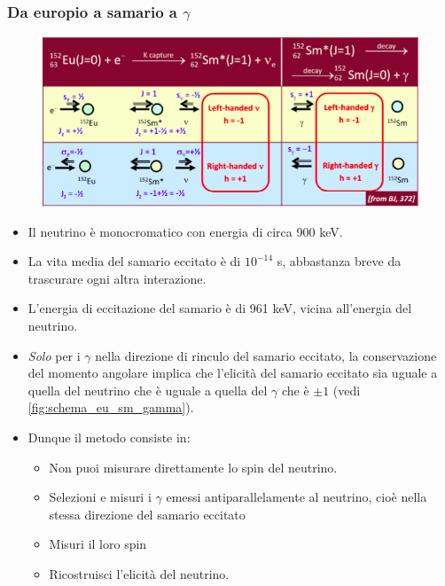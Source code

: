 \subsubsection{Da europio a samario a $\gamma$}
\begin{figure}[H]
    \centering
    \includegraphics[width=\textwidth]{immagini/fig_schema_eu_sm_gamma.png}
    \caption{}
    \label{fig:schema_eu_sm_gamma}
\end{figure}
\begin{itemize}
    \item Il neutrino è monocromatico con energia di circa 900 keV.
    \item La vita media del samario eccitato è di $10^{-14}$ s, abbastanza breve da trascurare ogni altra interazione.
    \item L'energia di eccitazione del samario è di 961 keV, vicina all'energia del neutrino.
    \item \textit{Solo} per i $\gamma$ nella direzione di rinculo del samario eccitato, la conservazione del momento angolare implica che l'elicità del samario eccitato sia uguale a quella del neutrino che è uguale a quella del $\gamma$ che è $\pm1$ (vedi \autoref{fig:schema_eu_sm_gamma}).
    \item Dunque il metodo consiste in:
    \begin{itemize}
        \item Non puoi misurare direttamente lo spin del neutrino.
        \item Selezioni e misuri i $\gamma$ emessi antiparallelamente al neutrino, cioè nella stessa direzione del samario eccitato
        \item Misuri il loro spin
        \item Ricostruisci l'elicità del neutrino.
    \end{itemize}
\end{itemize}
